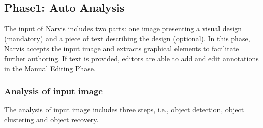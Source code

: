 


\subsection{Phase1: Auto Analysis}


The input of Narvis includes two parts: one image presenting a visual design (mandatory) and a piece of text describing the design (optional). In this phase, Narvis accepts the input image and extracts graphical elements to facilitate further authoring. If text is provided, editors are able to add and edit annotations in the Manual Editing Phase.

\subsubsection{Analysis of input image}
The analysis of input image includes three steps, i.e., object detection, object clustering and object recovery.

